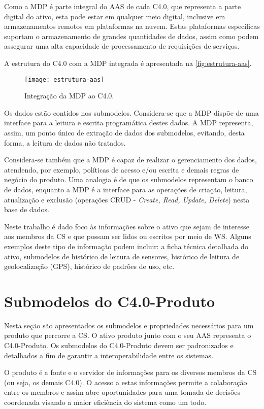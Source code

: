 Como a MDP é parte integral do AAS de cada C4.0, que representa a parte digital do ativo, esta pode estar em qualquer meio digital, inclusive em armazenamentos remotos em plataformas na nuvem. Estas plataformas específicas suportam o armazenamento de grandes quantidades de dados, assim como podem assegurar uma alta capacidade de processamento de requisições de serviços.

A estrutura do C4.0 com a MDP integrada é apresentada na \autoref{fig:estrutura-aas}.

\begin{figure}[htb]
	\centering
	\texttt{[image: estrutura-aas]}
	\caption{Integração da MDP ao C4.0.}
	\label{fig:estrutura-aas}
\end{figure}

Os dados estão contidos nos submodelos. Considera-se que a MDP dispõe de uma interface para a leitura e escrita programática destes dados. A MDP representa, assim, um ponto único de extração de dados dos submodelos, evitando, desta forma, a leitura de dados não tratados.

Considera-se também que a MDP é capaz de realizar o gerenciamento dos dados, atendendo, por exemplo, políticas de acesso e/ou escrita e demais regras de negócio do produto. Uma analogia é de que os submodelos representam o banco de dados, enquanto a MDP é a interface para as operações de criação, leitura, atualização e exclusão (operações CRUD - \textit{Create, Read, Update, Delete}) nesta base de dados.

Neste trabalho é dado foco às informações sobre o ativo que sejam de interesse aos membros da CS e que possam ser lidos ou escritos por meio de WS. Alguns exemplos deste tipo de informação podem incluir: a ficha técnica detalhada do ativo, submodelos de histórico de leitura de sensores, histórico de leitura de geolocalização (GPS), histórico de padrões de uso, etc.

\section{Submodelos do C4.0-Produto}
\label{sec:submodelos-produto}

Nesta seção são apresentados os submodelos e propriedades necessários para um produto que percorre a CS. O ativo produto junto com o seu AAS representa o C4.0-Produto. Os submodelos do C4.0-Produto devem ser padronizados e detalhados a fim de garantir a interoperabilidade entre os sistemas.

O produto é a fonte e o servidor de informações para os diversos membros da CS (ou seja, os demais C4.0). O acesso a estas informações permite a colaboração entre os membros e assim abre oportunidades para uma tomada de decisões coordenada visando a maior eficiência do sistema como um todo.

